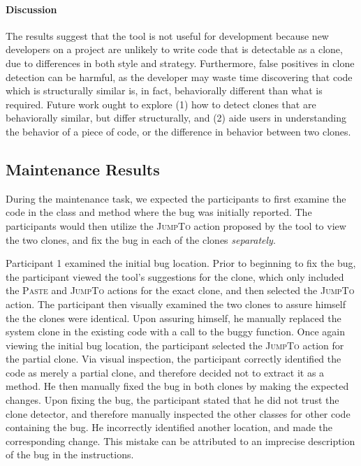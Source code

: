 \documentclass[nocopyrightspace,10pt]{sigplanconf}
\begin{document}
\paragraph{Discussion}
The results suggest that the tool is not useful for development
because new developers on a project are unlikely to write code that is
detectable as a clone, due to differences in both style and
strategy. Furthermore, false positives in clone detection can be harmful, as the developer may
waste time discovering that code which is structurally similar is, in fact, behaviorally
different than what is required. Future work ought to explore (1) how
to detect clones that are behaviorally similar, but differ
structurally, and (2) aide users in understanding the behavior of a
piece of code, or the difference in behavior between two clones.

\subsection{Maintenance Results}
During the maintenance task, we expected the participants to first
examine the code in the class and method where the bug was initially
reported. The participants would then utilize the \textsc{JumpTo}
action proposed by the tool to view the two clones, and fix the bug in
each of the clones \textit{separately}.

Participant 1 examined the initial bug location. Prior to beginning to
fix the bug, the participant viewed the tool's suggestions for the
clone, which only included the \textsc{Paste} and \textsc{JumpTo}
actions for the exact clone, and then selected the \textsc{JumpTo}
action. The participant then visually examined the two clones to
assure himself the the clones were identical. Upon assuring himself,
he manually replaced the system clone in the existing code with a call
to the buggy function. Once again viewing the initial bug location,
the participant selected the \textsc{JumpTo} action for the partial
clone. Via visual inspection, the participant correctly identified the
code as merely a partial clone, and therefore decided not to extract
it as a method. He then manually fixed the bug in both clones by
making the expected changes. Upon fixing the bug, the participant
stated that he did not trust the clone detector, and therefore
manually inspected the other classes for other code containing the
bug. He incorrectly identified another location, and made the
corresponding change. This mistake can be attributed to an imprecise
description of the bug in the instructions.
\end{document}
